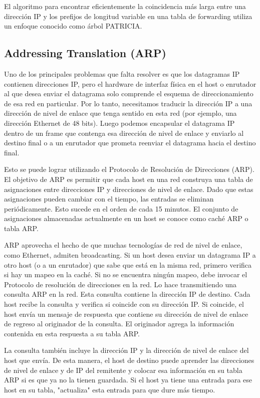 El algoritmo para encontrar eficientemente la coincidencia más larga entre una dirección IP y los prefijos de longitud variable en una tabla de forwarding utiliza un enfoque conocido como árbol PATRICIA.

\subsection{Addressing Translation (ARP)}
Uno de los principales problemas que falta resolver es que los datagramas IP contienen direcciones IP, pero el hardware de interfaz física en el host o enrutador al que desea enviar el datagrama solo comprende el esquema de direccionamiento de esa red en particular. Por lo tanto, necesitamos traducir la dirección IP a una dirección de nivel de enlace que tenga sentido en esta red (por ejemplo, una dirección Ethernet de 48 bits). Luego podemos encapsular el datagrama IP dentro de un frame que contenga esa dirección de nivel de enlace y enviarlo al destino final o a un enrutador que prometa reenviar el datagrama hacia el destino final.

Esto se puede lograr utilizando el Protocolo de Resolución de Direcciones (ARP). El objetivo de ARP es permitir que cada host en una red construya una tabla de asignaciones entre direcciones IP y direcciones de nivel de enlace. Dado que estas asignaciones pueden cambiar con el tiempo, las entradas se eliminan periódicamente. Esto sucede en el orden de cada 15 minutos. El conjunto de asignaciones almacenadas actualmente en un host se conoce como caché ARP o tabla ARP.


ARP aprovecha el hecho de que muchas tecnologías de red de nivel de enlace, como Ethernet, admiten broadcasting. Si un host desea enviar un datagrama IP a otro host (o a un enrutador) que sabe que está en la misma red, primero verifica si hay un mapeo en la caché. Si no se encuentra ningún mapeo, debe invocar el Protocolo de resolución de direcciones en la red. Lo hace transmitiendo una consulta ARP en la red. Esta consulta contiene la dirección IP de destino. Cada host recibe la consulta y verifica si coincide con su dirección IP. Si coincide, el host envía un mensaje de respuesta que contiene su dirección de nivel de enlace de regreso al originador de la consulta. El originador agrega la información contenida en esta respuesta a su tabla ARP.

La consulta también incluye la dirección IP y la dirección de nivel de enlace del host que envía. De esta manera, el host de destino puede aprender las direcciones de nivel de enlace y de IP del remitente y colocar esa información en su tabla ARP si es que ya no la tienen guardada.  Si el host ya tiene una entrada para ese host en su tabla, "actualiza" esta entrada para que dure más tiempo.

